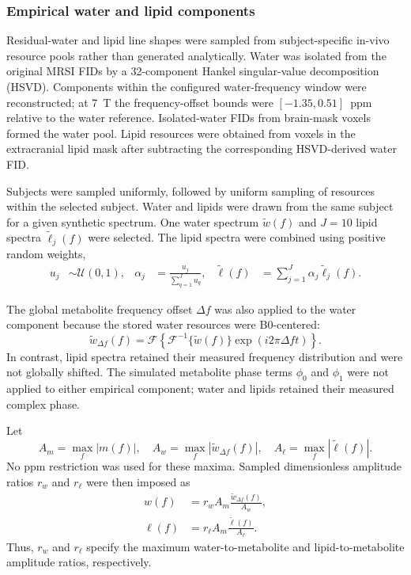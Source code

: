 \subsubsection{Empirical water and lipid components}

Residual-water and lipid line shapes were sampled from subject-specific
in-vivo resource pools rather than generated analytically.  Water was isolated
from the original MRSI FIDs by a 32-component Hankel singular-value
decomposition (HSVD).  Components within the configured water-frequency
window were reconstructed; at 7~T the frequency-offset bounds were
$[-1.35,0.51]$~ppm relative to the water reference.  Isolated-water FIDs from
brain-mask voxels formed the water pool.  Lipid resources were obtained from
voxels in the extracranial lipid mask after subtracting the corresponding
HSVD-derived water FID.

Subjects were sampled uniformly, followed by uniform sampling of resources
within the selected subject.  Water and lipids were drawn from the same subject
for a given synthetic spectrum.  One water spectrum $\widetilde w(f)$ and
$J=10$ lipid spectra $\widetilde\ell_j(f)$ were selected.  The lipid spectra
were combined using positive random weights,
\begin{align}
    u_j &\sim \mathcal{U}(0,1), &
    \alpha_j &= \frac{u_j}{\sum_{q=1}^{J}u_q}, &
    \widetilde\ell(f)&=\sum_{j=1}^{J}\alpha_j
    \widetilde\ell_j(f).
    \label{eq:lipid_mixture}
\end{align}

The global metabolite frequency offset $\Delta f$ was also applied to the
water component because the stored water resources were B0-centered:
\begin{equation}
    \widetilde w_{\Delta f}(f)
    =\mathcal{F}\!\left\{
      \mathcal{F}^{-1}\{\widetilde w(f)\}
      \exp(i2\pi\Delta f t)
    \right\}.
\end{equation}
In contrast, lipid spectra retained their measured frequency distribution and
were not globally shifted.  The simulated metabolite phase terms $\phi_0$ and
$\phi_1$ were not applied to either empirical component; water and lipids
retained their measured complex phase.

Let
\begin{equation}
    A_m=\max_f|m(f)|,\quad
    A_w=\max_f|\widetilde w_{\Delta f}(f)|,\quad
    A_\ell=\max_f|\widetilde\ell(f)|.
\end{equation}
No ppm restriction was used for these maxima.  Sampled dimensionless amplitude
ratios $r_w$ and $r_\ell$ were then imposed as
\begin{align}
    w(f)&=r_w A_m\frac{\widetilde w_{\Delta f}(f)}{A_w},\\
    \ell(f)&=r_\ell A_m\frac{\widetilde\ell(f)}{A_\ell}.
    \label{eq:water_lipid_scaling}
\end{align}
Thus, $r_w$ and $r_\ell$ specify the maximum water-to-metabolite and
lipid-to-metabolite amplitude ratios, respectively.

